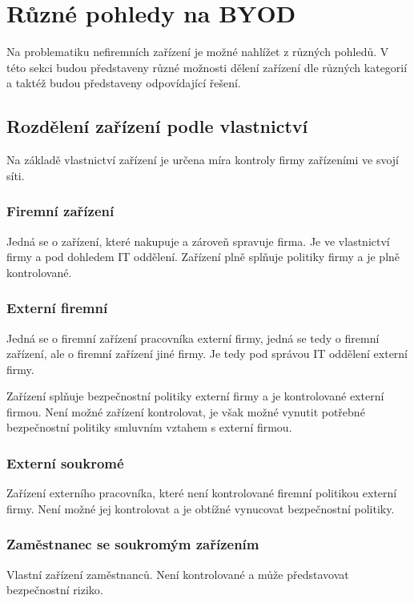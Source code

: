 



 \section{Různé pohledy na BYOD}
 Na problematiku nefiremních zařízení je možné nahlížet z různých pohledů. V této sekci budou představeny různé možnosti dělení zařízení dle různých kategorií a taktéž budou představeny odpovídající řešení.
 
 \subsection{Rozdělení zařízení podle vlastnictví}
 Na základě vlastnictví zařízení je určena míra kontroly firmy zařízeními ve svojí síti.
 
 \subsubsection{Firemní zařízení}
 Jedná se o zařízení, které nakupuje a zároveň spravuje firma. Je ve vlastnictví firmy a pod dohledem IT oddělení. Zařízení plně splňuje politiky firmy a je plně kontrolované.
 
 \subsubsection{Externí firemní}
 Jedná se o firemní zařízení pracovníka externí firmy, jedná se tedy o firemní zařízení, ale o firemní zařízení jiné firmy. Je tedy pod správou IT oddělení externí firmy.
 
 Zařízení splňuje bezpečnostní politiky externí firmy a je kontrolované externí firmou. Není možné zařízení kontrolovat, je však možné vynutit potřebné bezpečnostní politiky smluvním vztahem s externí firmou.
 
 \subsubsection{Externí soukromé}
 Zařízení externího pracovníka, které není kontrolované firemní politikou externí firmy. Není možné jej kontrolovat a je obtížné vynucovat bezpečnostní politiky.
 
 \subsubsection{Zaměstnanec se soukromým zařízením}
 Vlastní zařízení zaměstnanců. Není kontrolované a může představovat bezpečnostní riziko.
 
